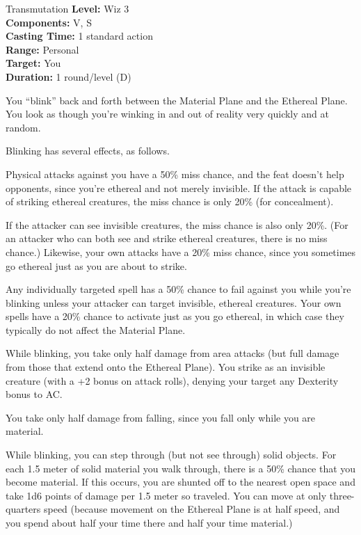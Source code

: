 {Transmutation}
{
	\textbf{Level:}
	Wiz 3\\
	\textbf{Components:}
	V, S\\
	\textbf{Casting Time:}
	1 standard action\\
	\textbf{Range:}
	Personal\\
	\textbf{Target:}
	You\\
	\textbf{Duration:}
	1 round/level (D)\\
}
{
	You ``blink'' back and forth between the Material Plane and the Ethereal Plane. You look as though you're winking in and out of reality very quickly and at random.

	Blinking has several effects, as follows.

	Physical attacks against you have a 50\% miss chance, and the  feat doesn't help opponents, since you're ethereal and not merely invisible. If the attack is capable of striking ethereal creatures, the miss chance is only 20\% (for concealment).

	If the attacker can see invisible creatures, the miss chance is also only 20\%. (For an attacker who can both see and strike ethereal creatures, there is no miss chance.) Likewise, your own attacks have a 20\% miss chance, since you sometimes go ethereal just as you are about to strike.

	Any individually targeted spell has a 50\% chance to fail against you while you're blinking unless your attacker can target invisible, ethereal creatures. Your own spells have a 20\% chance to activate just as you go ethereal, in which case they typically do not affect the Material Plane.

	While blinking, you take only half damage from area attacks (but full damage from those that extend onto the Ethereal Plane). You strike as an invisible creature (with a +2 bonus on attack rolls), denying your target any Dexterity bonus to AC.

	You take only half damage from falling, since you fall only while you are material.

	While blinking, you can step through (but not see through) solid objects. For each 1.5 meter of solid material you walk through, there is a 50\% chance that you become material. If this occurs, you are shunted off to the nearest open space and take 1d6 points of damage per 1.5 meter so traveled. You can move at only three-quarters speed (because movement on the Ethereal Plane is at half speed, and you spend about half your time there and half your time material.)

}

